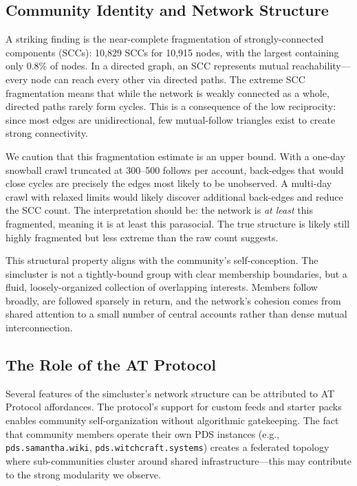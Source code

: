 \documentclass[11pt,a4paper]{article}
\begin{document}
\subsection{Community Identity and Network Structure}

A striking finding is the near-complete fragmentation of strongly-connected components (SCCs): 10,829 SCCs for 10,915 nodes, with the largest containing only 0.8\% of nodes. In a directed graph, an SCC represents mutual reachability---every node can reach every other via directed paths. The extreme SCC fragmentation means that while the network is weakly connected as a whole, directed paths rarely form cycles. This is a consequence of the low reciprocity: since most edges are unidirectional, few mutual-follow triangles exist to create strong connectivity.

We caution that this fragmentation estimate is an upper bound. With a one-day snowball crawl truncated at 300--500 follows per account, back-edges that would close cycles are precisely the edges most likely to be unobserved. A multi-day crawl with relaxed limits would likely discover additional back-edges and reduce the SCC count. The interpretation should be: the network is \textit{at least} this fragmented, meaning it is at least this parasocial. The true structure is likely still highly fragmented but less extreme than the raw count suggests.

This structural property aligns with the community's self-conception. The simcluster is not a tightly-bound group with clear membership boundaries, but a fluid, loosely-organized collection of overlapping interests. Members follow broadly, are followed sparsely in return, and the network's cohesion comes from shared attention to a small number of central accounts rather than dense mutual interconnection.

\subsection{The Role of the AT Protocol}

Several features of the simcluster's network structure can be attributed to AT Protocol affordances. The protocol's support for custom feeds and starter packs enables community self-organization without algorithmic gatekeeping. The fact that community members operate their own PDS instances (e.g., \texttt{pds.samantha.wiki}, \texttt{pds.witchcraft.systems}) creates a federated topology where sub-communities cluster around shared infrastructure---this may contribute to the strong modularity we observe.
\end{document}
